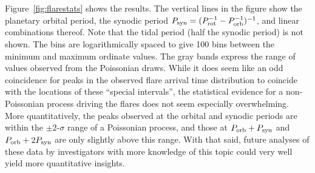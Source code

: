 \documentclass[12pt,modern,twocolumn,tighten]{aastex63}
\begin{document}
Figure~\ref{fig:flarestats} shows the results.  The vertical lines in
the figure show the planetary orbital period, the synodic period
$P_{\rm syn} = (P_{\rm rot}^{-1} - P_{\rm orb}^{-1})^{-1}$, and linear
combinations thereof.  Note that the tidal period (half the synodic
period) is not shown.  The bins are logarithmically spaced to give 100
bins between the minimum and maximum ordinate values.  The gray bands
express the range of values observed from the Poissonian draws.  While
it does seem like an odd coincidence for peaks in the observed
flare arrival time distribution to coincide with the locations of
these ``special intervals'', the statistical evidence for a
non-Poissonian process driving the flares does not seem especially
overwhelming.  More quantitatively, the peaks observed at the orbital and
synodic periods are within the $\pm 2$-$\sigma$ range of a Poissonian
process, and those at $P_{\rm orb}+P_{\rm syn}$ and $P_{\rm
orb}+2P_{\rm syn}$ are only slightly above this range.  With that
said, future analyses of these data by investigators with more
knowledge of this topic could very well yield more quantitative
insights.



\listofchanges

\end{document}
